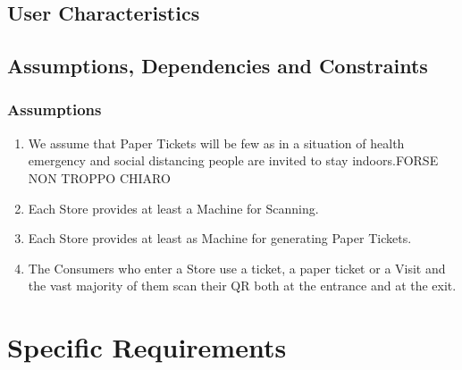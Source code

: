 \documentclass[a4paper, 10pt, oneside]{article}
\newcommand*{\lorenzo}[1]{\textcolor{BurntOrange}{#1}}
\begin{document}
\subsection{User Characteristics}

\subsection{Assumptions, Dependencies and Constraints}
\subsubsection{Assumptions}
\begin{enumerate}[label={DA.\arabic{*}}]
    \item \label{dom:fewPaperTickets} 
We assume that Paper Tickets will be few as in a situation of health emergency and social distancing people are invited to stay indoors.\lorenzo{FORSE NON TROPPO CHIARO}
    \item \label{dom:machineScanning}Each Store provides at least a Machine for Scanning.
    \item \label{dom:machinePaperTicket}Each Store provides at least as Machine for generating Paper Tickets.
    \item \label{dom:consumerAccessStore}The Consumers who enter a Store use a ticket, a paper ticket or a Visit and the vast majority of them scan their QR both at the entrance and at the exit.
\end{enumerate}
\section{Specific Requirements}
\label{specificRequirements}
\end{document}
